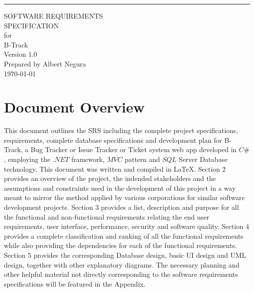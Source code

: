 \documentclass[openany, oneside,11pt]{book}
\date{}
\def\myversion{1.0 }
\begin{document}
\thispagestyle{empty}
\begin{flushright}
    \rule{16cm}{5pt}\vskip1cm
    \begin{bfseries}
        \Huge{SOFTWARE REQUIREMENTS\\ SPECIFICATION}\\
        \vspace{1.5cm}
        for\\
        \vspace{1.5cm}
        B-Track\\
        \vspace{1.5cm}
        \LARGE{Version \myversion}\\
        \vspace{1.5cm}
        Prepared by Albert Negura\\
        \vspace{1.5cm}
        \today\\
    \end{bfseries}
\end{flushright}
\clearpage
\setcounter{page}{1}
\tableofcontents
\thispagestyle{fancy}
\chapter{Document Overview}
\thispagestyle{fancy}
This document outlines the SRS including the complete project specifications, requirements, complete database specifications and development plan for B-Track, a Bug Tracker or Issue Tracker or Ticket system web app developed in $C\#$, employing the $.NET$ framework, $MVC$ pattern and $SQL$ Server Database technology. This document was written and compiled in LaTeX.
\newline
\newline
Section 2 provides an overview of the project, the indended stakeholders and the assumptions and constraints used in the development of this project in a way meant to mirror the method applied by various corporations for similar software development projects.
\newline
\newline
Section 3 provides a list, description and purpose for all the functional and non-functional requirements relating the end user requirements, user interface, performance, security and software quality.
\newline
\newline
Section 4 provides a complete classification and ranking of all the functional requirements while also providing the dependencies for each of the functional requirements.
\newline
\newline
Section 5 provides the corresponding Database design, basic UI design and UML design, together with other explanatory diagrams.
\newline
\newline
The necessary planning and other helpful material not directly corresponding to the software requirements specifications will be featured in the Appendix.
\newline
\newline
\end{document}
